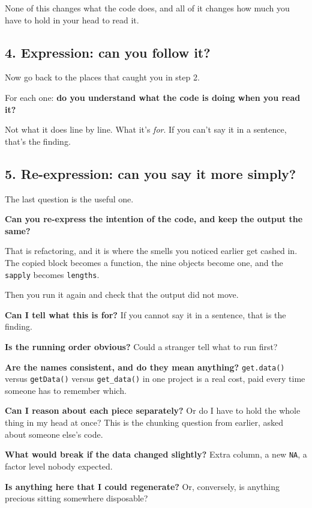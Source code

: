 \documentclass[
  letterpaper,
  justified,
  a4paper]{tufte-book}
\begin{document}
None of this changes what the code does, and all of it changes how much
you have to hold in your head to read it.

\subsection{4. Expression: can you follow
it?}\label{expression-can-you-follow-it}

Now go back to the places that caught you in step 2.

For each one: \textbf{do you understand what the code is doing when you
read it?}

Not what it does line by line. What it's \emph{for}. If you can't say it
in a sentence, that's the finding.

\subsection{5. Re-expression: can you say it more
simply?}\label{re-expression-can-you-say-it-more-simply}

The last question is the useful one.

\textbf{Can you re-express the intention of the code, and keep the
output the same?}

That is refactoring, and it is where the smells you noticed earlier get
cashed in. The copied block becomes a function, the nine objects become
one, and the \texttt{sapply} becomes \texttt{lengths}.

Then you run it again and check that the output did not move.

\begin{tcolorbox}[enhanced jigsaw, arc=.35mm, bottomrule=.15mm, bottomtitle=1mm, breakable, colback=white, colbacktitle=quarto-callout-tip-color!10!white, colframe=quarto-callout-tip-color-frame, coltitle=black, left=2mm, leftrule=.75mm, opacityback=0, opacitybacktitle=0.6, rightrule=.15mm, title=\textcolor{quarto-callout-tip-color}{\faLightbulb}\hspace{0.5em}{Some questions worth asking as you go}, titlerule=0mm, toprule=.15mm, toptitle=1mm]

\textbf{Can I tell what this is for?} If you cannot say it in a
sentence, that is the finding.

\textbf{Is the running order obvious?} Could a stranger tell what to run
first?

\textbf{Are the names consistent, and do they mean anything?}
\texttt{get.data()} versus \texttt{getData()} versus
\texttt{get\_data()} in one project is a real cost, paid every time
someone has to remember which.

\textbf{Can I reason about each piece separately?} Or do I have to hold
the whole thing in my head at once? This is the chunking question from
earlier, asked about someone else's code.

\textbf{What would break if the data changed slightly?} Extra column, a
new \texttt{NA}, a factor level nobody expected.

\textbf{Is anything here that I could regenerate?} Or, conversely, is
anything precious sitting somewhere disposable?

\end{tcolorbox}
\end{document}

